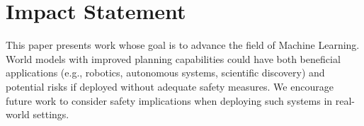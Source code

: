 \section*{Impact Statement}

This paper presents work whose goal is to advance the field of Machine Learning. World models with improved planning capabilities could have both beneficial applications (e.g., robotics, autonomous systems, scientific discovery) and potential risks if deployed without adequate safety measures. We encourage future work to consider safety implications when deploying such systems in real-world settings.